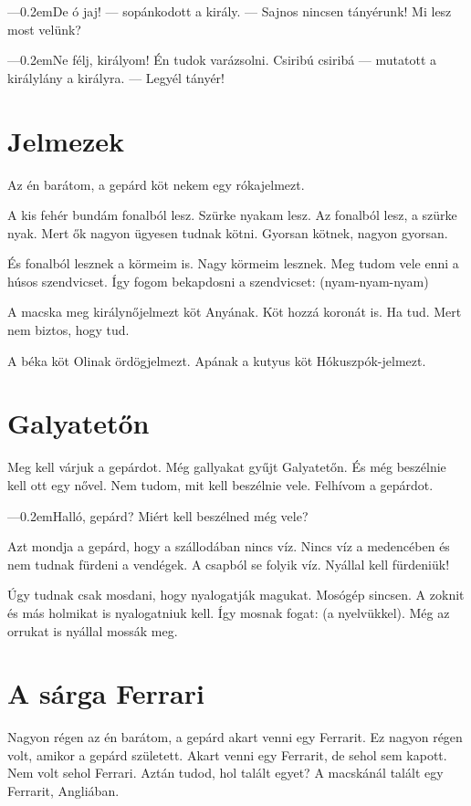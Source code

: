 \documentclass[12pt]{memoir}
\def\dash{---\kern 0.2em}
\begin{document}
\dash De ó jaj! — sopánkodott a király. — Sajnos nincsen tányérunk! Mi lesz most
velünk?

\dash Ne félj, királyom! Én tudok varázsolni. Csiribú csiribá — mutatott a
királylány a királyra. — Legyél tányér!
\cleartoverso


\section{Jelmezek}
Az én barátom, a gepárd köt nekem egy rókajelmezt.

A kis fehér bundám fonalból lesz. Szürke nyakam lesz. Az fonalból lesz, a
szürke nyak. Mert ők nagyon ügyesen tudnak kötni. Gyorsan kötnek, nagyon
gyorsan.

És fonalból lesznek a körmeim is. Nagy körmeim lesznek. Meg tudom vele enni a
húsos szendvicset. Így fogom bekapdosni a szendvicset: (nyam-nyam-nyam)

A macska meg királynőjelmezt köt Anyának. Köt hozzá koronát is. Ha tud. Mert
nem biztos, hogy tud.

A béka köt Olinak ördögjelmezt. Apának a kutyus köt Hókuszpók-jelmezt.
\cleartoverso


\section{Galyatetőn}
Meg kell várjuk a gepárdot. Még gallyakat gyűjt Galyatetőn. És még beszélnie
kell ott egy nővel. Nem tudom, mit kell beszélnie vele. Felhívom a gepárdot.

\dash Halló, gepárd? Miért kell beszélned még vele?

Azt mondja a gepárd, hogy a szállodában nincs víz. Nincs víz a medencében és
nem tudnak fürdeni a vendégek. A csapból se folyik víz. Nyállal kell fürdeniük!

Úgy tudnak csak mosdani, hogy nyalogatják magukat. Mosógép sincsen. A zoknit és
más holmikat is nyalogatniuk kell. Így mosnak fogat: (a nyelvükkel). Még az
orrukat is nyállal mossák meg.
\cleartoverso


\section{A sárga Ferrari}
Nagyon régen az én barátom, a gepárd akart venni egy Ferrarit. Ez nagyon régen
volt, amikor a gepárd született. Akart venni egy Ferrarit, de sehol sem kapott.
Nem volt sehol Ferrari. Aztán tudod, hol talált egyet? A macskánál talált egy
Ferrarit, Angliában.
\end{document}
